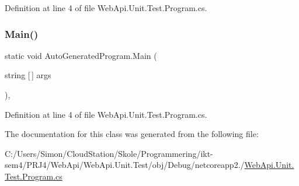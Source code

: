 Definition at line 4 of file Web\+Api.\+Unit.\+Test.\+Program.\+cs.

\mbox{\label{class_auto_generated_program_a10fe504a3ffa3644fc9de3ad978c9baf}} 
\subsubsection{\texorpdfstring{Main()}{Main()}\hspace{0.1cm}{\footnotesize\ttfamily [2/2]}}
{\footnotesize\ttfamily static void Auto\+Generated\+Program.\+Main (\begin{DoxyParamCaption}\item[{string \mbox{[}$\,$\mbox{]}}]{args }\end{DoxyParamCaption})\hspace{0.3cm}{\ttfamily [static]}, {\ttfamily [private]}}



Definition at line 4 of file Web\+Api.\+Unit.\+Test.\+Program.\+cs.



The documentation for this class was generated from the following file\+:\begin{DoxyCompactItemize}
\item 
C\+:/\+Users/\+Simon/\+Cloud\+Station/\+Skole/\+Programmering/ikt-\/sem4/\+P\+R\+J4/\+Web\+Api/\+Web\+Api.\+Unit.\+Test/obj/\+Debug/netcoreapp2./\mbox{\hyperlink{_debug_2netcoreapp2_80_2_web_api_8_unit_8_test_8_program_8cs}{Web\+Api.\+Unit.\+Test.\+Program.\+cs}}\end{DoxyCompactItemize}
